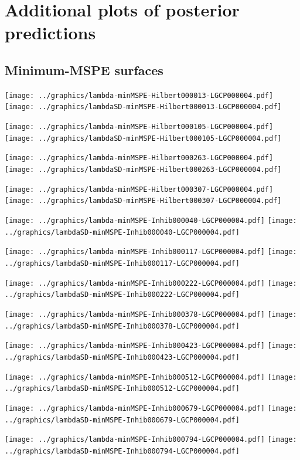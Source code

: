 \documentclass[review]{elsarticle}
\begin{document}
\section{Additional plots of posterior predictions}
\label{moreplots}

\subsection{Minimum-MSPE surfaces}

\texttt{[image: ../graphics/lambda-minMSPE-Hilbert000013-LGCP000004.pdf]}
\texttt{[image: ../graphics/lambdaSD-minMSPE-Hilbert000013-LGCP000004.pdf]}

\texttt{[image: ../graphics/lambda-minMSPE-Hilbert000105-LGCP000004.pdf]}
\texttt{[image: ../graphics/lambdaSD-minMSPE-Hilbert000105-LGCP000004.pdf]}

\texttt{[image: ../graphics/lambda-minMSPE-Hilbert000263-LGCP000004.pdf]}
\texttt{[image: ../graphics/lambdaSD-minMSPE-Hilbert000263-LGCP000004.pdf]}

\texttt{[image: ../graphics/lambda-minMSPE-Hilbert000307-LGCP000004.pdf]}
\texttt{[image: ../graphics/lambdaSD-minMSPE-Hilbert000307-LGCP000004.pdf]}

\texttt{[image: ../graphics/lambda-minMSPE-Inhib000040-LGCP000004.pdf]}
\texttt{[image: ../graphics/lambdaSD-minMSPE-Inhib000040-LGCP000004.pdf]}

\texttt{[image: ../graphics/lambda-minMSPE-Inhib000117-LGCP000004.pdf]}
\texttt{[image: ../graphics/lambdaSD-minMSPE-Inhib000117-LGCP000004.pdf]}

\texttt{[image: ../graphics/lambda-minMSPE-Inhib000222-LGCP000004.pdf]}
\texttt{[image: ../graphics/lambdaSD-minMSPE-Inhib000222-LGCP000004.pdf]}

\texttt{[image: ../graphics/lambda-minMSPE-Inhib000378-LGCP000004.pdf]}
\texttt{[image: ../graphics/lambdaSD-minMSPE-Inhib000378-LGCP000004.pdf]}

\texttt{[image: ../graphics/lambda-minMSPE-Inhib000423-LGCP000004.pdf]}
\texttt{[image: ../graphics/lambdaSD-minMSPE-Inhib000423-LGCP000004.pdf]}

\texttt{[image: ../graphics/lambda-minMSPE-Inhib000512-LGCP000004.pdf]}
\texttt{[image: ../graphics/lambdaSD-minMSPE-Inhib000512-LGCP000004.pdf]}

\texttt{[image: ../graphics/lambda-minMSPE-Inhib000679-LGCP000004.pdf]}
\texttt{[image: ../graphics/lambdaSD-minMSPE-Inhib000679-LGCP000004.pdf]}

\texttt{[image: ../graphics/lambda-minMSPE-Inhib000794-LGCP000004.pdf]}
\texttt{[image: ../graphics/lambdaSD-minMSPE-Inhib000794-LGCP000004.pdf]}
\end{document}
